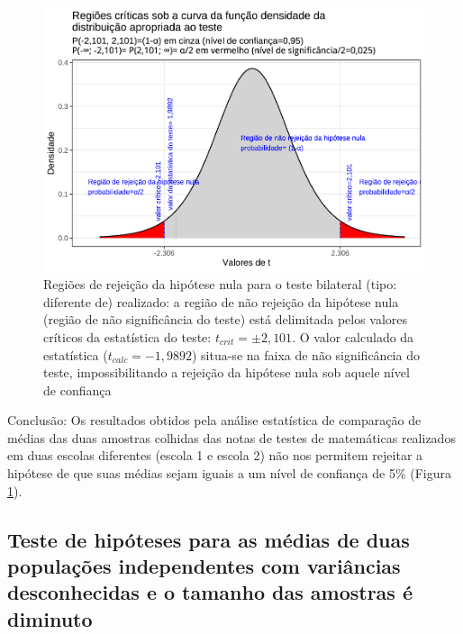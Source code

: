 \documentclass[
]{book}
\begin{document}
\begin{figure}

{\centering \includegraphics[width=1\linewidth]{apostila_files/figure-latex/fig89-1} 

}

\caption{Regiões de rejeição da hipótese nula para o teste bilateral (tipo: diferente de) realizado: a região de não rejeição da hipótese nula (região de não significância do teste) está delimitada pelos valores críticos da estatística do teste: $t_{crit} =\pm 2,101$. O valor calculado da estatística ($t_{calc}=-1,9892$) situa-se na faixa de não significância do teste, impossibilitando a rejeição da hipótese nula sob aquele nível de confiança}\label{fig:fig89}
\end{figure}

\hfill\break

Conclusão: Os resultados obtidos pela análise estatística de comparação de médias das duas amostras colhidas das notas de testes de matemáticas realizados em duas escolas diferentes (escola 1 e escola 2) não nos permitem rejeitar a hipótese de que suas médias sejam iguais a um nível de confiança de 5\%
(Figura \ref{fig:fig89}).

\hfill\break

\hfill\break

\hypertarget{teste-de-hipuxf3teses-para-as-muxe9dias-de-duas-populauxe7uxf5es-independentes-com-variuxe2ncias-desconhecidas-e-o-tamanho-das-amostras-uxe9-diminuto}{%
\subsection{Teste de hipóteses para as médias de duas populações independentes com variâncias desconhecidas e o tamanho das amostras é diminuto}\label{teste-de-hipuxf3teses-para-as-muxe9dias-de-duas-populauxe7uxf5es-independentes-com-variuxe2ncias-desconhecidas-e-o-tamanho-das-amostras-uxe9-diminuto}}
\end{document}
